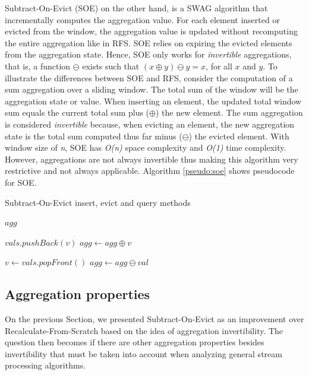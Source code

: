 Subtract-On-Evict (SOE) on the other hand, is a SWAG algorithm that incrementally computes the aggregation value. For each element inserted or evicted from the window, the aggregation value is updated without recomputing the entire aggregation like in RFS. SOE relies on expiring the evicted elements from the aggregation state. Hence, SOE only works for \textit{invertible} aggregations, that is, a function $\ominus$ exists such that $(x \oplus y) \ominus y = x$, for all $x$ and $y$. To illustrate the differences between SOE and RFS, consider the computation of a sum aggregation over a sliding window. The total sum of the window will be the aggregation state or value. When inserting an element, the updated total window sum equals the current total sum plus ($\oplus$) the new element. The sum aggregation is considered \textit{invertible} because, when evicting an element, the new aggregation state is the total sum computed thus far minus ($\ominus$) the evicted element. With window size of \textit{n}, SOE has \textit{O(n)} space complexity and \textit{O(1)} time complexity. However, aggregations are not always invertible thus making this algorithm very restrictive and not always applicable. Algorithm \ref{pseudo:soe} shows pseudocode for SOE.

\begin{algorithm}
    \caption{Subtract-On-Evict insert, evict and query methods}
    \label{pseudo:soe}
    \begin{algorithmic}[1]
        
            \State \Return $agg$
        \EndFunction
        
        
        
            \State $vals.pushBack(v)$
            \State $agg \gets agg \oplus v$
        \EndFunction
        
        
        
            \State $v \gets vals.popFront()$
            \State $agg \gets agg \ominus val$
        \EndFunction
    \end{algorithmic}
\end{algorithm}

\subsection{Aggregation properties}
\label{sec:agg-properties}

On the previous Section, we presented Subtract-On-Evict as an improvement over Recalculate-From-Scratch based on the idea of aggregation invertibility. The question then becomes if there are other aggregation properties besides invertibility that must be taken into account when analyzing general stream processing algorithms.

